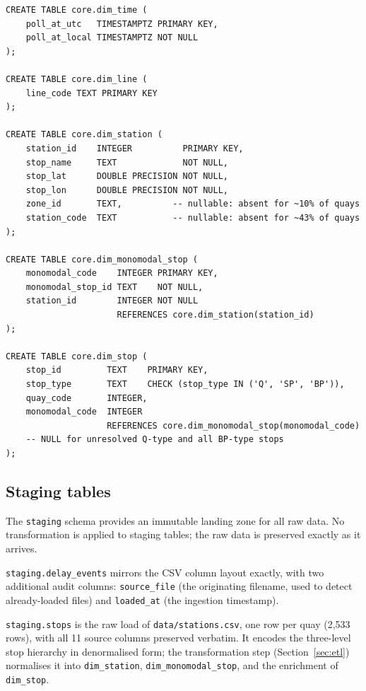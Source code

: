 \documentclass[a4paper,11pt]{article}
\begin{document}
\begin{lstlisting}[style=sql, caption={Dimension table DDL (\texttt{sql/schema/02\_core.sql}).}]
CREATE TABLE core.dim_time (
    poll_at_utc   TIMESTAMPTZ PRIMARY KEY,
    poll_at_local TIMESTAMPTZ NOT NULL
);

CREATE TABLE core.dim_line (
    line_code TEXT PRIMARY KEY
);

CREATE TABLE core.dim_station (
    station_id    INTEGER          PRIMARY KEY,
    stop_name     TEXT             NOT NULL,
    stop_lat      DOUBLE PRECISION NOT NULL,
    stop_lon      DOUBLE PRECISION NOT NULL,
    zone_id       TEXT,          -- nullable: absent for ~10% of quays
    station_code  TEXT           -- nullable: absent for ~43% of quays
);

CREATE TABLE core.dim_monomodal_stop (
    monomodal_code    INTEGER PRIMARY KEY,
    monomodal_stop_id TEXT    NOT NULL,
    station_id        INTEGER NOT NULL
                      REFERENCES core.dim_station(station_id)
);

CREATE TABLE core.dim_stop (
    stop_id         TEXT    PRIMARY KEY,
    stop_type       TEXT    CHECK (stop_type IN ('Q', 'SP', 'BP')),
    quay_code       INTEGER,
    monomodal_code  INTEGER
                    REFERENCES core.dim_monomodal_stop(monomodal_code)
    -- NULL for unresolved Q-type and all BP-type stops
);
\end{lstlisting}

\subsection{Staging tables}

The \texttt{staging} schema provides an immutable landing zone for all raw data.
No transformation is applied to staging tables; the raw data is preserved exactly
as it arrives.

\texttt{staging.delay\_events} mirrors the CSV column layout exactly, with two
additional audit columns: \texttt{source\_file} (the originating filename, used to
detect already-loaded files) and \texttt{loaded\_at} (the ingestion timestamp).

\texttt{staging.stops} is the raw load of \texttt{data/stations.csv}, one row per
quay (2,533 rows), with all 11 source columns preserved verbatim.
It encodes the three-level stop hierarchy in denormalised form; the transformation
step (Section~\ref{sec:etl}) normalises it into \texttt{dim\_station},
\texttt{dim\_monomodal\_stop}, and the enrichment of \texttt{dim\_stop}.
\end{document}
